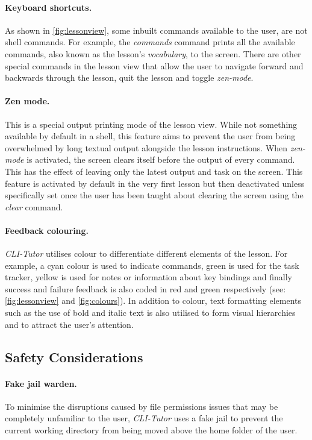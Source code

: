 \paragraph{Keyboard shortcuts.} As shown in
\autoref{fig:lessonview}, some inbuilt commands available to the user, are
not shell commands. For example, the \textit{commands} command prints all the
available commands, also known as the lesson's \textit{vocabulary}, to the
screen. There are other special commands in the lesson view that allow the user
to navigate forward and backwards through the lesson, quit the lesson and
toggle \textit{zen-mode}.

\paragraph{Zen mode.} This is a special output printing mode of the lesson
view. While not something available by default in a shell, this feature aims to
prevent the user from being overwhelmed by long textual output alongside the
lesson instructions. When \textit{zen-mode} is activated, the screen clears
itself before the output of every command. This has the effect of leaving only
the latest output and task on the screen. This feature is activated by default
in the very first lesson but then deactivated unless specifically set once the
user has been taught about clearing the screen using the \textit{clear}
command.

\paragraph{Feedback colouring.} \textit{CLI-Tutor} utilises colour to
differentiate different elements of the lesson. For example, a cyan colour is
used to indicate commands, green is used for the task tracker, yellow is used
for notes or information about key bindings and finally success and failure
feedback is also coded in red and green respectively (see:
\autoref{fig:lessonview} and \autoref{fig:colours}). In addition to colour,
text formatting elements such as the use of bold and italic text is also
utilised to form visual hierarchies and to attract the user's attention.

\subsection{Safety Considerations}

\paragraph{Fake jail warden.} To minimise the disruptions caused by file
permissions issues that may be completely unfamiliar to the user,
\textit{CLI-Tutor} uses a fake jail to prevent the current working directory
from being moved above the home folder of the user.

